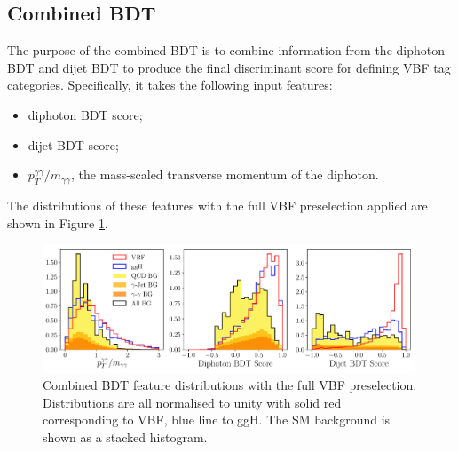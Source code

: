 \subsection{Combined BDT}
The purpose of the combined BDT is to combine information from the diphoton BDT and dijet BDT to produce the final discriminant score for defining VBF tag categories. 
Specifically, it takes the following input features:
\begin{itemize}[noitemsep]
    \item diphoton BDT score;
    \item dijet BDT score;
    \item $p_{T}^{\gamma\gamma}/m_{\gamma\gamma}$, the mass-scaled transverse momentum of the diphoton.
\end{itemize}
The distributions of these features with the full VBF preselection applied are shown in Figure \ref{fig:event_categorisaton:combined_bdt_features}.
\begin{figure}[h!]
    \centering
    \includegraphics[width=0.99\textwidth]{figures/event_selection/combined_BDT_features_splitBG_PS.pdf}
    \caption{Combined BDT feature distributions with the full VBF preselection. Distributions are all normalised to unity with solid red corresponding to VBF, blue line to ggH. The SM background is shown as a stacked histogram.}
    \label{fig:event_categorisaton:combined_bdt_features}
\end{figure}

